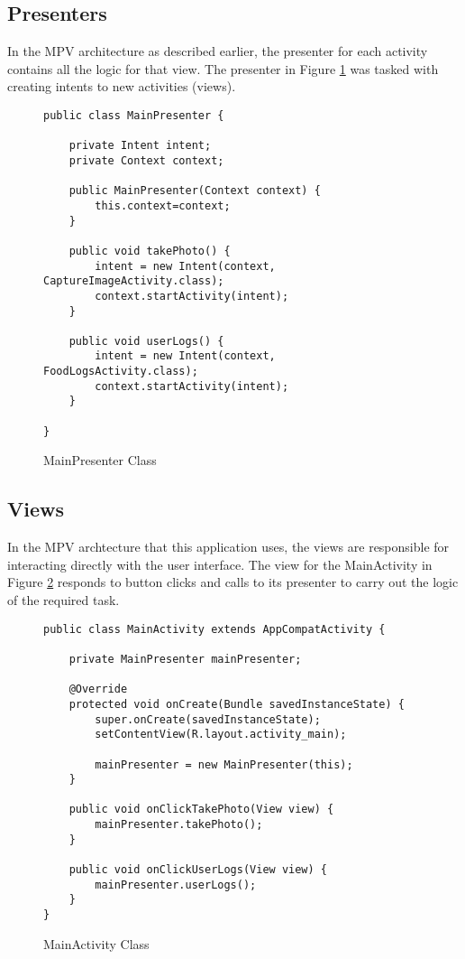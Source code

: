\tocless\subsection{Presenters}
In the MPV architecture as described earlier, the presenter for each activity contains all the logic for that view.
The presenter in Figure \ref{lst:pres} was tasked with creating intents to new activities (views).
\begin{figure}[h]
\caption{MainPresenter Class}
\label{lst:pres}
\begin{lstlisting}[style=Java]
public class MainPresenter {

    private Intent intent;
    private Context context;

    public MainPresenter(Context context) {
        this.context=context;
    }

    public void takePhoto() {
        intent = new Intent(context, CaptureImageActivity.class);
        context.startActivity(intent);
    }

    public void userLogs() {
        intent = new Intent(context, FoodLogsActivity.class);
        context.startActivity(intent);
    }

}
\end{lstlisting}
\end{figure}

\tocless\subsection{Views}
In the MPV archtecture that this application uses, the views are responsible for interacting directly with the user interface.
The view for the MainActivity in Figure \ref{lst:mainView} responds to button clicks and calls to its presenter to carry out the logic of the required task.
\begin{figure}[h]
\caption{MainActivity Class}
\label{lst:mainView}
\begin{lstlisting}[style=Java]
public class MainActivity extends AppCompatActivity {

    private MainPresenter mainPresenter;

    @Override
    protected void onCreate(Bundle savedInstanceState) {
        super.onCreate(savedInstanceState);
        setContentView(R.layout.activity_main);

        mainPresenter = new MainPresenter(this);
    }

    public void onClickTakePhoto(View view) {
        mainPresenter.takePhoto();
    }

    public void onClickUserLogs(View view) {
        mainPresenter.userLogs();
    }
}
\end{lstlisting}
\end{figure}

